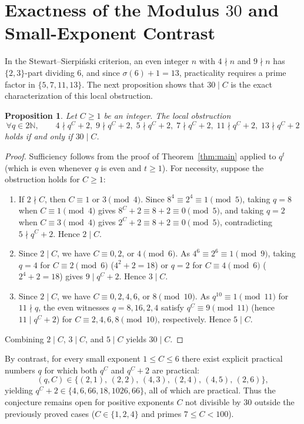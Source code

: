 \documentclass[11pt,a4paper]{article}
\newtheorem{proposition}[theorem]{Proposition}
\begin{document}
\section{Exactness of the Modulus $30$ and Small-Exponent Contrast}

In the Stewart--Sierpi\'{n}ski criterion, an even integer $n$ with $4 \nmid n$ and $9 \nmid n$ has $\{2, 3\}$-part dividing $6$, and since $\sigma(6) + 1 = 13$, practicality requires a prime factor in $\{5, 7, 11, 13\}$. The next proposition shows that $30 \mid C$ is the exact characterization of this local obstruction.

\begin{proposition}\label{prop:sharp}
Let $C \ge 1$ be an integer. The local obstruction
\[
\forall q \in 2\mathbb{N},\qquad 4 \nmid q^C + 2,\; 9 \nmid q^C + 2,\; 5 \nmid q^C + 2,\; 7 \nmid q^C + 2,\; 11 \nmid q^C + 2,\; 13 \nmid q^C + 2
\]
holds if and only if $30 \mid C$.
\end{proposition}

\begin{proof}
Sufficiency follows from the proof of Theorem~\ref{thm:main} applied to $q^t$ (which is even whenever $q$ is even and $t \ge 1$). For necessity, suppose the obstruction holds for $C \ge 1$:
\begin{enumerate}
\item If $2 \nmid C$, then $C \equiv 1$ or $3 \pmod{4}$. Since $8^4 \equiv 2^4 \equiv 1 \pmod{5}$, taking $q = 8$ when $C \equiv 1 \pmod{4}$ gives $8^C + 2 \equiv 8 + 2 \equiv 0 \pmod{5}$, and taking $q = 2$ when $C \equiv 3 \pmod{4}$ gives $2^C + 2 \equiv 8 + 2 \equiv 0 \pmod{5}$, contradicting $5 \nmid q^C + 2$. Hence $2 \mid C$.
\item Since $2 \mid C$, we have $C \equiv 0, 2$, or $4 \pmod{6}$. As $4^6 \equiv 2^6 \equiv 1 \pmod{9}$, taking $q = 4$ for $C \equiv 2 \pmod{6}$ ($4^2 + 2 = 18$) or $q = 2$ for $C \equiv 4 \pmod{6}$ ($2^4 + 2 = 18$) gives $9 \mid q^C + 2$. Hence $3 \mid C$.
\item Since $2 \mid C$, we have $C \equiv 0, 2, 4, 6$, or $8 \pmod{10}$. As $q^{10} \equiv 1 \pmod{11}$ for $11 \nmid q$, the even witnesses $q = 8, 16, 2, 4$ satisfy $q^C \equiv 9 \pmod{11}$ (hence $11 \mid q^C + 2$) for $C \equiv 2, 4, 6, 8 \pmod{10}$, respectively. Hence $5 \mid C$.
\end{enumerate}
Combining $2 \mid C$, $3 \mid C$, and $5 \mid C$ yields $30 \mid C$.
\end{proof}

By contrast, for every small exponent $1 \le C \le 6$ there exist explicit practical numbers $q$ for which both $q^C$ and $q^C + 2$ are practical:
\[
(q, C) \in \{(2, 1),\, (2, 2),\, (4, 3),\, (2, 4),\, (4, 5),\, (2, 6)\},
\]
yielding $q^C + 2 \in \{4, 6, 66, 18, 1026, 66\}$, all of which are practical. Thus the conjecture remains open for positive exponents $C$ not divisible by $30$ outside the previously proved cases ($C \in \{1, 2, 4\}$ and primes $7 \le C < 100$).
\end{document}
